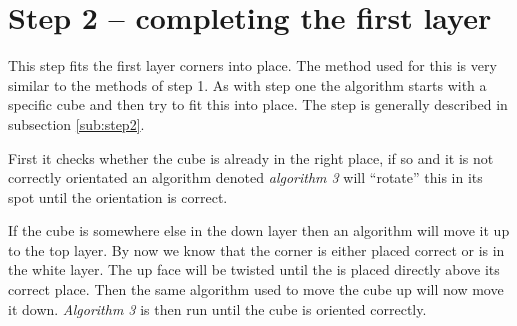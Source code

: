 \section{Step 2 -- completing the first layer}
This step fits the first layer corners into place. The method used for this is very similar to the methods of step 1. 
As with step one the algorithm starts with a specific cube and then try to fit this into place. 
The step is generally described in subsection \ref{sub:step2}.

First it checks whether the cube is already in the right place, if so and it is not correctly orientated an algorithm denoted \textit{algorithm 3} will ``rotate'' this \cpiece{} in its spot until the orientation is correct. 

If the cube is somewhere else in the down layer then an algorithm will move it up to the top layer. 
By now we know that the corner \cpiece{} is either placed correct or is in the white layer. 
The up face will be twisted until the \cpiece{} is placed directly above its correct place. 
Then the same algorithm used to move the cube up will now move it down. 
\textit{Algorithm 3} is then run until the cube is oriented correctly.
